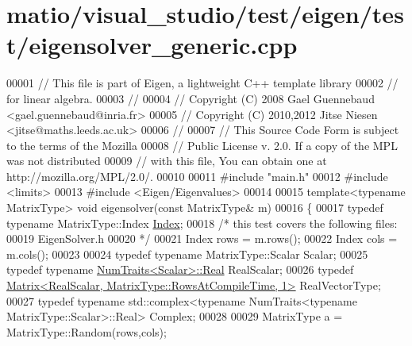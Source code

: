 \hypertarget{matio_2visual__studio_2test_2eigen_2test_2eigensolver__generic_8cpp_source}{}\section{matio/visual\+\_\+studio/test/eigen/test/eigensolver\+\_\+generic.cpp}
\label{matio_2visual__studio_2test_2eigen_2test_2eigensolver__generic_8cpp_source}

\begin{DoxyCode}
00001 \textcolor{comment}{// This file is part of Eigen, a lightweight C++ template library}
00002 \textcolor{comment}{// for linear algebra.}
00003 \textcolor{comment}{//}
00004 \textcolor{comment}{// Copyright (C) 2008 Gael Guennebaud <gael.guennebaud@inria.fr>}
00005 \textcolor{comment}{// Copyright (C) 2010,2012 Jitse Niesen <jitse@maths.leeds.ac.uk>}
00006 \textcolor{comment}{//}
00007 \textcolor{comment}{// This Source Code Form is subject to the terms of the Mozilla}
00008 \textcolor{comment}{// Public License v. 2.0. If a copy of the MPL was not distributed}
00009 \textcolor{comment}{// with this file, You can obtain one at http://mozilla.org/MPL/2.0/.}
00010 
00011 \textcolor{preprocessor}{#include "main.h"}
00012 \textcolor{preprocessor}{#include <limits>}
00013 \textcolor{preprocessor}{#include <Eigen/Eigenvalues>}
00014 
00015 \textcolor{keyword}{template}<\textcolor{keyword}{typename} MatrixType> \textcolor{keywordtype}{void} eigensolver(\textcolor{keyword}{const} MatrixType& m)
00016 \{
00017   \textcolor{keyword}{typedef} \textcolor{keyword}{typename} MatrixType::Index \hyperlink{namespace_eigen_a62e77e0933482dafde8fe197d9a2cfde}{Index};
00018   \textcolor{comment}{/* this test covers the following files:}
00019 \textcolor{comment}{     EigenSolver.h}
00020 \textcolor{comment}{  */}
00021   Index rows = m.rows();
00022   Index cols = m.cols();
00023 
00024   \textcolor{keyword}{typedef} \textcolor{keyword}{typename} MatrixType::Scalar Scalar;
00025   \textcolor{keyword}{typedef} \textcolor{keyword}{typename} \hyperlink{group___core___module_struct_eigen_1_1_num_traits}{NumTraits<Scalar>::Real} RealScalar;
00026   \textcolor{keyword}{typedef} \hyperlink{group___core___module_class_eigen_1_1_matrix}{Matrix<RealScalar, MatrixType::RowsAtCompileTime, 1>}
       RealVectorType;
00027   \textcolor{keyword}{typedef} \textcolor{keyword}{typename} std::complex<typename NumTraits<typename MatrixType::Scalar>::Real> Complex;
00028 
00029   MatrixType a = MatrixType::Random(rows,cols);

\end{DoxyCode}
